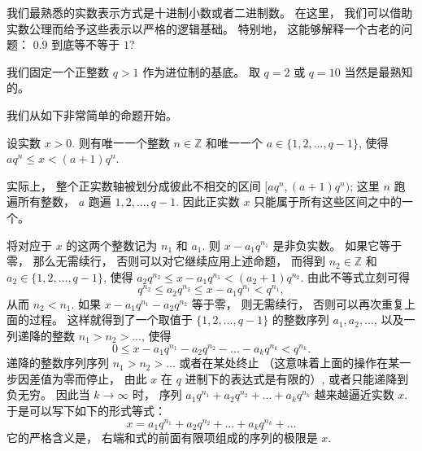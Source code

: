 


我们最熟悉的实数表示方式是十进制小数或者二进制数。 在这里， 我们可以借助实数公理而给予这些表示以严格的逻辑基础。 特别地， 这能够解释一个古老的问题： $0.\dot{9}$ 到底等不等于 $1$?

我们固定一个正整数 $q>1$ 作为进位制的基底。 取 $q=2$ 或 $q=10$ 当然是最熟知的。

我们从如下非常简单的命题开始。 
\begin{lemma}{}
设实数 $x>0$. 则有唯一一个整数 $n\in\mathbb{Z}$ 和唯一一个 $a\in\{1,2,...,q-1\}$, 使得 $aq^n\leq x<(a+1)q^{n}$.
\end{lemma}

实际上， 整个正实数轴被划分成彼此不相交的区间 $[aq^n,(a+1)q^{n})$; 这里 $n$ 跑遍所有整数， $a$ 跑遍 $1,2,...,q-1$. 因此正实数 $x$ 只能属于所有这些区间之中的一个。 

将对应于 $x$ 的这两个整数记为 $n_1$ 和 $a_1$. 则 $x-a_1q^{n_1}$ 是非负实数。 如果它等于零， 那么无需续行， 否则可以对它继续应用上述命题， 而得到 $n_2\in\mathbb{Z}$ 和 $a_2\in\{1,2,...,q-1\}$, 使得 $a_2q^{n_2}\leq x-a_1q^{n_1}<(a_2+1)q^{n_2}$. 由此不等式立刻可得
\[
q^{n_2}\leq a_2q^{n_2}\leq x-a_1q^{n_1}<q^{n_1},
\]
从而 $n_2<n_1$. 如果 $x-a_1q^{n_1}-a_2q^{n_2}$ 等于零， 则无需续行， 否则可以再次重复上面的过程。 这样就得到了一个取值于 $\{1,2,...,q-1\}$ 的整数序列 $a_1,a_2,...$, 以及一列递降的整数 $n_1>n_2>...$, 使得
\[ 
0\leq x-a_1q^{n_1}-a_2q^{n_2}-...-a_kq^{n_k}<q^{n_k}.
\]
递降的整数序列序列 $n_1>n_2>...$ 或者在某处终止 （这意味着上面的操作在某一步因差值为零而停止， 由此 $x$ 在 $q$ 进制下的表达式是有限的）, 或者只能递降到负无穷。 因此当 $k\to\infty$ 时， 序列 $a_1q^{n_1}+a_2q^{n_2}+...+a_kq^{n_k}$ 越来越逼近实数 $x$. 于是可以写下如下的形式等式：
\[
x=a_1q^{n_1}+a_2q^{n_2}+...+a_kq^{n_k}+...
\]
它的严格含义是， 右端和式的前面有限项组成的序列的极限是 $x$.
